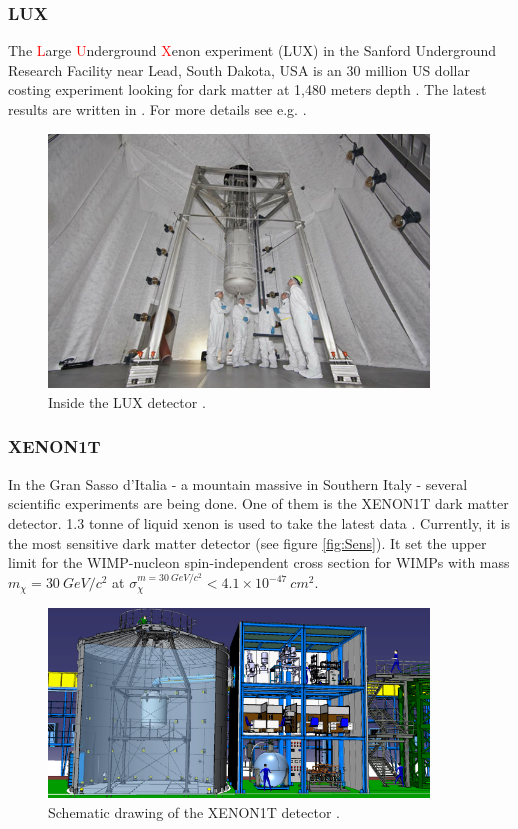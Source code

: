 \documentclass{article}
\begin{document}
\subsubsection{LUX}
\label{sec:LUX}The \textcolor{red}{L}arge \textcolor{red}{U}nderground \textcolor{red}{X}enon experiment (LUX) in the Sanford Underground Research Facility near Lead, South Dakota, USA is an 30 million US dollar costing experiment looking for dark matter at 1,480 meters depth \cite{Reich2013}. The latest results are written in \cite{Akerib:2016vxi}. For more details see e.g. \cite{Akerib:2012ys}.

\begin{figure}[h]
    \centering
    \includegraphics[width=0.9\textwidth]{lux.jpg}
    \caption{Inside the LUX detector \cite{PhysWorld}.}
    \label{fig:LUX}
\end{figure}

\subsubsection{XENON1T}
\label{sec:XENON}In the Gran Sasso d'Italia - a mountain massive in Southern Italy - several scientific experiments are being done. One of them is the XENON1T dark matter detector. 1.3 tonne of liquid xenon is used to take the latest data \cite{Aprile:2018dbl}. Currently, it is the most sensitive dark matter detector (see figure \ref{fig:Sens}). It set the upper limit for the WIMP-nucleon spin-independent cross section for WIMPs with mass $m_\chi =30\ GeV/c^2$ at $\sigma_\chi^{m=30\ GeV/c^2}<4.1\times 10^{-47}\ cm^2$.

\begin{figure}[h]
    \centering
    \includegraphics[width=0.9\textwidth]{Xenon1T.png}
    \caption{Schematic drawing of the XENON1T detector \cite{Perdue}.}
    \label{fig:XENON1T}
\end{figure}
\end{document}
